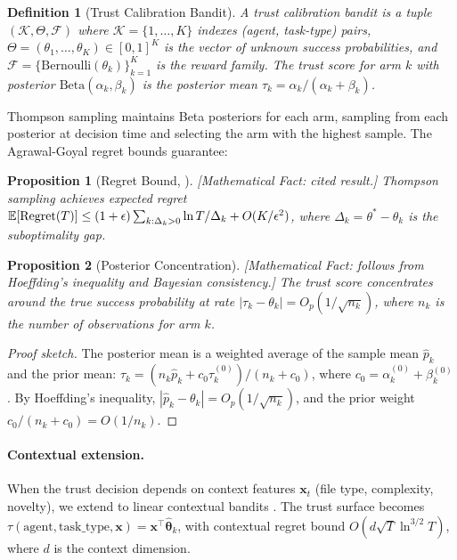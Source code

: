 \documentclass[11pt, a4paper]{googledeepmind}
\newtheorem{definition}{Definition}[section]
\newtheorem{proposition}{Proposition}[section]
\begin{document}
\begin{definition}[Trust Calibration Bandit]
\label{def:trust-bandit}
A trust calibration bandit is a tuple $(\mathcal{K}, \Theta, \mathcal{F})$ where $\mathcal{K} = \{1, \ldots, K\}$ indexes (agent, task-type) pairs, $\Theta = (\theta_1, \ldots, \theta_K) \in [0,1]^K$ is the vector of unknown success probabilities, and $\mathcal{F} = \{\text{Bernoulli}(\theta_k)\}_{k=1}^K$ is the reward family. The trust score for arm $k$ with posterior $\text{Beta}(\alpha_k, \beta_k)$ is the posterior mean $\tau_k = \alpha_k / (\alpha_k + \beta_k)$.
\end{definition}

Thompson sampling maintains Beta posteriors for each arm, sampling from each posterior at decision time and selecting the arm with the highest sample. The Agrawal-Goyal regret bounds \citep{agrawal2012analysis} guarantee:

\begin{proposition}[Regret Bound, \citealt{agrawal2012analysis}]
\emph{[Mathematical Fact: cited result.]}
\label{thm:regret}
Thompson sampling achieves expected regret $\mathbb{E}[\textup{Regret}(T)] \leq (1+\epsilon) \sum_{k: \Delta_k > 0} \ln T / \Delta_k + O(K/\epsilon^2)$, where $\Delta_k = \theta^* - \theta_k$ is the suboptimality gap.
\end{proposition}

\begin{proposition}[Posterior Concentration]
\emph{[Mathematical Fact: follows from Hoeffding's inequality and Bayesian consistency.]}
\label{prop:concentration}
The trust score concentrates around the true success probability at rate $|\tau_k - \theta_k| = O_p(1/\sqrt{n_k})$, where $n_k$ is the number of observations for arm $k$.
\end{proposition}

\begin{proof}[Proof sketch]
The posterior mean is a weighted average of the sample mean $\hat{p}_k$ and the prior mean: $\tau_k = (n_k \hat{p}_k + c_0 \tau_k^{(0)}) / (n_k + c_0)$, where $c_0 = \alpha_k^{(0)} + \beta_k^{(0)}$. By Hoeffding's inequality, $|\hat{p}_k - \theta_k| = O_p(1/\sqrt{n_k})$, and the prior weight $c_0/(n_k + c_0) = O(1/n_k)$.
\end{proof}

\paragraph{Contextual extension.} When the trust decision depends on context features $\mathbf{x}_t$ (file type, complexity, novelty), we extend to linear contextual bandits \citep{li2010contextual, agrawal2013thompson}. The trust surface becomes $\tau(\text{agent}, \text{task\_type}, \mathbf{x}) = \mathbf{x}^\top \hat{\boldsymbol{\theta}}_k$, with contextual regret bound $O(d\sqrt{T} \ln^{3/2} T)$, where $d$ is the context dimension.
\end{document}
